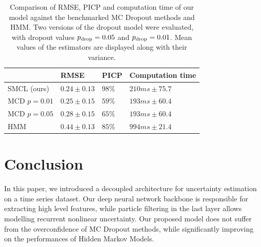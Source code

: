\documentclass[conference]{IEEEtran}
\begin{document}
\begin{table}[htpb]
	\centering
	\caption{Comparison of RMSE, PICP and computation time of our model against the benchmarked MC Dropout methods and HMM.
		Two versions of the dropout model were evaluated, with dropout values $p_\textnormal{drop}=0.05$ and $p_\textnormal{drop}=0.01$.
		Mean values of the estimators are displayed along with their variance.}
	\label{tab:ci_comparison}
	\begin{tabular}{llll}
		\toprule
		             & RMSE            & PICP   & Computation time  \\
		\toprule
		SMCL (ours)  & $0.24 \pm 0.13$ & $98\%$ & $210 ms \pm 75.7$ \\
		MCD $p=0.01$ & $0.25 \pm 0.15$ & $59\%$ & $193 ms \pm 60.4$ \\
		MCD $p=0.05$ & $0.28 \pm 0.15$ & $65\%$ & $193 ms \pm 60.4$ \\
		HMM          & $0.44 \pm 0.13$ & $85\%$ & $994 ms \pm 21.4$ \\
		\bottomrule
	\end{tabular}
\end{table}


\section{Conclusion}%
\label{sec:conclusion}

In this paper, we introduced a decoupled architecture for uncertainty estimation on a time series dataset.
Our deep neural network backbone is responsible for extracting high level features, while particle filtering in the last layer allows modelling recurrent nonlinear uncertainty.
Our proposed model does not suffer from the overconfidence of MC Dropout methods, while significantly improving on the performances of Hidden Markov Models.
\end{document}
